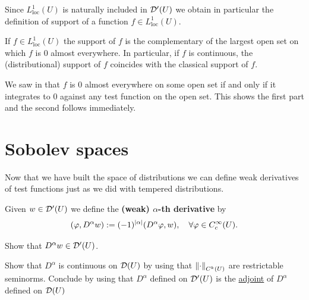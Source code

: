 \documentclass[
    a4paper,
    DIV=14,
    abstract=true,
    numbers=noenddot
]{scrartcl}
\begin{document}
Since $L^1_{\mathrm{loc}}(U)$ is naturally included in  $\mathcal{D}'(U)$ we obtain in particular the definition of support of a function $f \in L^1_{\mathrm{loc}}(U)$.
\begin{exercise}
	If  $f \in L^1_{\mathrm{loc}}(U)$ the support of $f$ is the complementary of the largest open set on which  $f$ is  $0$ almost everywhere. In particular, if $f$ is continuous, the (distributional) support of  $f$ coincides with the classical support of  $f$. \end{exercise}
\begin{hint}
	We saw in  that $f$ is  $0$ almost everywhere on some open set if and only if it integrates to $0$ against any test function on the open set. This shows the first part and the second follows immediately.
\end{hint}

\section{Sobolev spaces}
Now that we have built the space of distributions we can define weak derivatives of test functions just as we did with tempered distributions.
\begin{definition}
	Given $w \in \mathcal{D}'(U)$ we define the \textbf{(weak) $\alpha$-th derivative} by
	\begin{align*}
		(\varphi,D^\alpha w):=(-1)^{{\left| \alpha \right|} }(D^\alpha \varphi, w), \quad \forall \varphi \in C_c^\infty(U).
	\end{align*}
\end{definition}
\begin{exercise} Show that $D^\alpha w \in\mathcal{D}'(U)$.
\end{exercise}
\begin{hint}
	Show that $D^\alpha$ is continuous on $\mathcal{D}(U)$ by using that $\left\lVert \cdot  \right\rVert_{C^k(U)}$ are restrictable seminorms. Conclude by using that $D^\alpha$ defined on $\mathcal{D}'(U)$ is the \href{https://en.wikipedia.org/wiki/Transpose_of_a_linear_map}{adjoint} of $D^\alpha$ defined on $\mathcal{D}(U)$
\end{hint}
\end{document}
